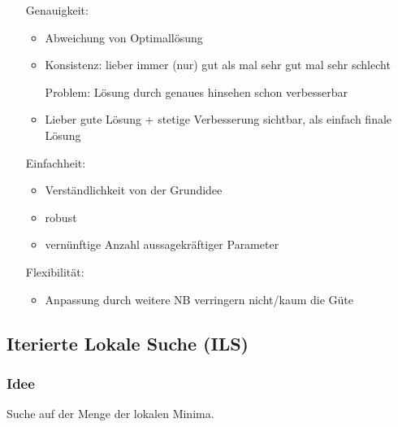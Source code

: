 \documentclass[12pt]{article}
\begin{document}
\begin{itemize}
\begin{itemize}
\begin{itemize}
							\end{itemize}
						\item[Genauigkeit:]
							\begin{itemize}
								\item Abweichung von Optimallösung
								\item Konsistenz: lieber immer (nur) gut als mal sehr gut mal sehr schlecht
								\item[Problem:] Lösung durch genaues hinsehen schon verbesserbar
								\item Lieber gute Lösung + stetige Verbesserung sichtbar, als einfach finale Lösung
							\end{itemize}
						\item[Einfachheit:]
							\begin{itemize}
								\item Verständlichkeit von der Grundidee
								\item robust
								\item vernünftige Anzahl aussagekräftiger Parameter
							\end{itemize}
						\item[Flexibilität:]
							\begin{itemize}
								\item Anpassung durch weitere NB verringern nicht/kaum die Güte
							\end{itemize}
					\end{itemize}
			\end{itemize}

		\subsection{Iterierte Lokale Suche (ILS)}
			\subsubsection{Idee}
				Suche auf der Menge der lokalen Minima.
\end{document}
